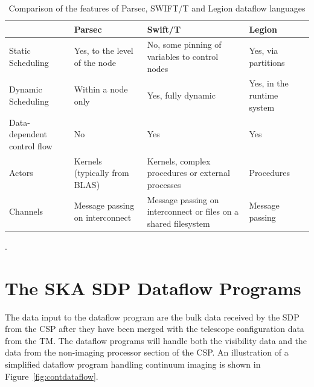 \documentclass[11pt,a4paper]{article}
\begin{document}
\begin{table}[h]
\centering
\begin{tabular}{|p{}|p{}|p{}|p{}|}
 \hline
& Parsec & Swift/T & Legion\\\hline
Static Scheduling &
Yes, to the level of the node &
No, some pinning of variables to control nodes  &
Yes, via partitions
\\\hline
Dynamic Scheduling &
Within a node only&
Yes, fully dynamic&
Yes, in the runtime system\\\hline
Data-dependent control flow &
No & Yes & Yes \\\hline
Actors & Kernels (typically from BLAS) & Kernels, complex procedures or external processes & Procedures \\\hline
Channels &
Message passing on interconnect &
Message passing on interconnect or files on a shared filesystem & Message passing \\\hline
\end{tabular}
\caption{Comparison of the features of Parsec, SWIFT/T and Legion dataflow languages}.
\label{tab:dataflowcomparision}
\end{table}

\section{The SKA SDP Dataflow Programs}
\label{sec:ska-sdp-dataflow}

The data input to the dataflow program are the bulk data received by
the SDP from the CSP after they have been merged with the telescope
configuration data from the TM. The dataflow programs will handle both
the visibility data and the data from the non-imaging processor
section of the CSP. An illustration of a simplified dataflow program
handling continuum imaging is shown in Figure~\ref{fig:contdataflow}.
\end{document}
